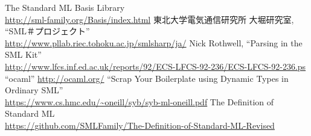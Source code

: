 \documentclass[11pt,a4paper]{jarticle}
\begin{document}
\begin{thebibliography}{9}
   The Standard ML Basis Library \\
    \url{http://sml-family.org/Basis/index.html}
   東北大学電気通信研究所 大堀研究室, ``SML＃プロジェクト''\\
    \url{http://www.pllab.riec.tohoku.ac.jp/smlsharp/ja/}
   Nick Rothwell, ``Parsing in the SML Kit'' \\
    \url{http://www.lfcs.inf.ed.ac.uk/reports/92/ECS-LFCS-92-236/ECS-LFCS-92-236.ps}
   ``ocaml''
    \url{http://ocaml.org/}
   ``Scrap Your Boilerplate using Dynamic Types in Ordinary SML'' \\
    \url{https://www.cs.hmc.edu/~oneill/syb/syb-ml-oneill.pdf}
   The Definition of Standard ML \\
    \url{https://github.com/SMLFamily/The-Definition-of-Standard-ML-Revised}

\end{thebibliography}
\end{document}
